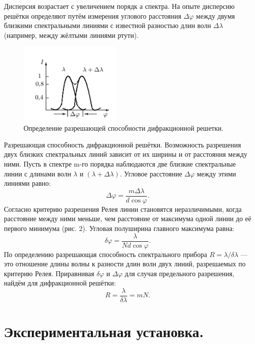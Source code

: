 \documentclass[a4paper, 14pt]{extarticle}%
\newcommand\ECaption[1]{%
     \captionsetup{font=footnotesize}%
     \caption{#1}}
\begin{document}
Дисперсия возрастает с увеличением порядк
а спектра. На опыте дисперсию решётки определяют путём измерения углового расстояния $\Delta\varphi$ между двумя близкими спектральными линиями с известной разностью
длин волн $ \Delta\lambda $ (например, между
жёлтыми линиями ртути).

\begin{figure}
\begin{center}
\includegraphics[height=4cm]{teor2.png}
\end{center}
\ECaption{Определение разрешающей способности дифракционной решетки.}
\end{figure}

Разрешающая способность дифракционной решётки. Возможность разрешения двух близких спектральных линий зависит от их ширины и от расстояния между ними.
Пусть в спектре
m-го порядка наблюдаются две близкие спектральные линии с длинами волн
$ \lambda $ и $ (\lambda + \Delta\lambda) $. Угловое расстояние
$ \Delta\varphi $ между этими линиями равно:
\begin{equation}
\Delta\varphi = \dfrac{m\Delta\lambda}{d\cos \varphi}.
\end{equation}
Согласно критерию разрешения
Релея линии становятся неразличимыми,
когда расстояние между ними меньше,
чем расстояние от максимума одной линии до её первого минимума (рис. 2). Угловая полуширина главного максимума равна:
\begin{equation}
\delta\varphi = \dfrac{\lambda}{Nd\cos \varphi}.
\end{equation}
По определению разрешающая способность спектрального прибора
$ R = \lambda/\delta\lambda $
— это отношение длины волны
к
разности длин волн двух
линий,
разрешаемых по критерию
Релея. Приравнивая $ \delta\varphi $
и
$ \Delta\varphi $ для
случая предельного разрешения, найдём для дифракционной решётки:
\begin{equation}
R = \dfrac{\lambda}{\delta\lambda} = mN.
\end{equation}

\section*{Экспериментальная установка.}
\end{document}
